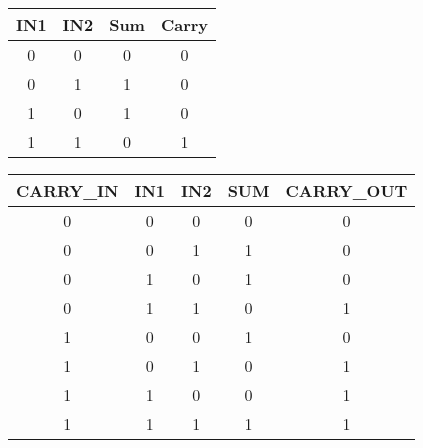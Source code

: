 \begin{tabular}{|c|c|c|c|}
    \hline 
    IN1 & IN2 & Sum & Carry \\ 
    \hline 
    0 & 0 & 0 & 0 \\ 
    \hline 
    0 & 1 & 1 & 0 \\ 
    \hline 
    1 & 0 & 1 & 0 \\ 
    \hline 
    1 & 1 & 0 & 1 \\ 
    \hline 
\end{tabular}

\begin{tabular}{|c|c|c|c|c|}
    \hline 
    CARRY_IN & IN1 & IN2 & SUM & CARRY_OUT \\ 
    \hline 
    0 & 0 & 0 & 0 & 0 \\ 
    \hline 
    0 & 0 & 1 & 1 & 0 \\ 
    \hline 
    0 & 1 & 0 & 1 & 0 \\ 
    \hline 
    0 & 1 & 1 & 0 & 1 \\ 
    \hline 
    1 & 0 & 0 & 1 & 0 \\ 
    \hline 
    1 & 0 & 1 & 0 & 1 \\ 
    \hline 
    1 & 1 & 0 & 0 & 1 \\ 
    \hline 
    1 & 1 & 1 & 1 & 1 \\ 
    \hline 
\end{tabular} 
